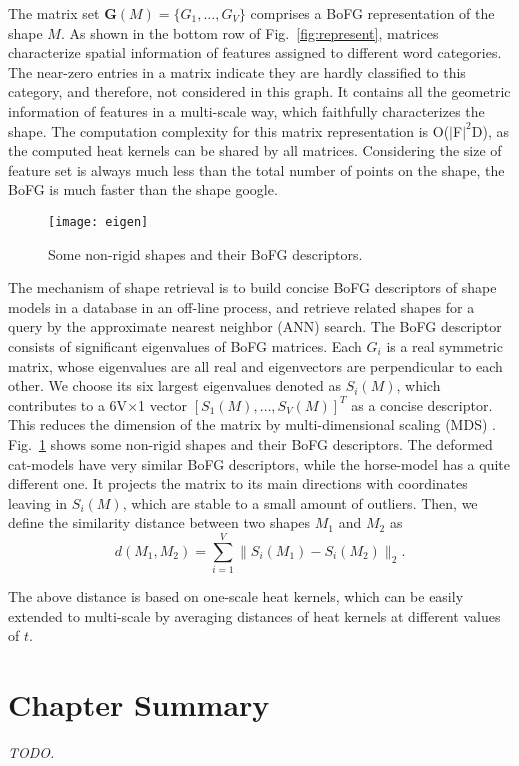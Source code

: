 The matrix set $\textbf{G}(M)=\{G_1,\dots,G_V\}$ comprises a BoFG representation of the shape $M$. As shown in the bottom row of Fig.~\ref{fig:represent}, matrices characterize spatial information of features assigned to different word categories. The near-zero entries in a matrix indicate they are hardly classified to this category, and therefore, not considered in this graph. It contains all the geometric information of features in a multi-scale way, which faithfully characterizes the shape. The computation complexity for this matrix representation is O($|$F$|^2$D), as the computed heat kernels can be shared by all matrices. Considering the size of feature set is always much less than the total number of points on the shape, the BoFG is much faster than the shape google.

\begin{figure}
\centering
\texttt{[image: eigen]}
\caption[Nonrigid shapes and their BoFG descriptors.]
{Some non-rigid shapes and their BoFG descriptors.}
\label{fig:eigen}
\end{figure}

The mechanism of shape retrieval is to build concise BoFG descriptors of shape models in a database in an off-line process, and retrieve related shapes for a query by the approximate nearest neighbor (ANN) search. The BoFG descriptor consists of significant eigenvalues of BoFG matrices. Each $G_i$ is a real symmetric matrix, whose eigenvalues are all real and eigenvectors are perpendicular to each other. We choose its six largest eigenvalues denoted as $S_i(M)$, which contributes to a 6V$\times$1 vector $[S_1(M),\dots,S_V(M)]^T$ as a concise descriptor. This reduces the dimension of the matrix by multi-dimensional scaling (MDS) \cite{Bronstein2006}. Fig.~\ref{fig:eigen} shows some non-rigid shapes and their BoFG descriptors. The deformed cat-models have very similar BoFG descriptors, while the horse-model has a quite different one. It projects the matrix to its main directions with coordinates leaving in $S_i(M)$, which are stable to a small amount of outliers. Then, we define the similarity distance between two shapes $M_1$ and $M_2$ as
\begin{equation}
d(M_1,M_2)=\sum_{i=1}^{V}\|S_i(M_1)-S_i(M_2) \|_2.
\end{equation}

The above distance is based on one-scale heat kernels, which can be easily extended to multi-scale by averaging distances of heat kernels at different values of $t$.

\section{Chapter Summary}
\emph{TODO.} 